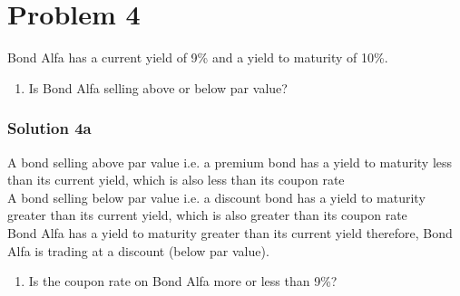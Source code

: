 \documentclass[12]{article}
\begin{document}
\noindent
\begin{table}[H]
    \centering
    \label{tab:my_label}
\end{table}

\noindent





\color{black}
\section*{Problem 4}
Bond Alfa has a current yield of 9\% and a yield to maturity of 10\%. 
\begin{enumerate}
    \item[a)] Is Bond Alfa selling above or below par value?   
\end{enumerate}

\color{blue}
\subsubsection*{Solution 4a}
A bond selling above par value i.e. a premium bond has a yield to maturity less than its current yield, which is also less than its coupon rate\\
A bond selling below par value i.e. a discount bond has a yield to maturity greater than its current yield, which is also greater than its coupon rate\\
Bond Alfa has a yield to maturity greater than its current yield therefore, Bond Alfa is trading at a discount (below par value).\\


\color{black}
\begin{enumerate}
    \item[b)] Is the coupon rate on Bond Alfa more or less than 9\%?
\end{enumerate}
\end{document}
